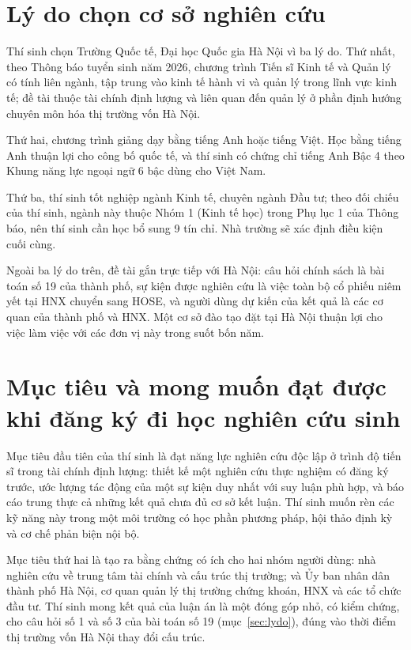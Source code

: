 \chapter{Lý do chọn cơ sở nghiên cứu}\label{ch:5}

Thí sinh chọn Trường Quốc tế, Đại học Quốc gia Hà Nội vì ba lý do. Thứ nhất, theo Thông báo tuyển sinh năm 2026, chương trình Tiến sĩ Kinh tế và Quản lý có tính liên ngành, tập trung vào kinh tế hành vi và quản lý trong lĩnh vực kinh tế; đề tài thuộc tài chính định lượng và liên quan đến quản lý ở phần định hướng chuyên môn hóa thị trường vốn Hà Nội.

Thứ hai, chương trình giảng dạy bằng tiếng Anh hoặc tiếng Việt. Học bằng tiếng Anh thuận lợi cho công bố quốc tế, và thí sinh có chứng chỉ tiếng Anh Bậc 4 theo Khung năng lực ngoại ngữ 6 bậc dùng cho Việt Nam.

Thứ ba, thí sinh tốt nghiệp ngành Kinh tế, chuyên ngành Đầu tư; theo đối chiếu của thí sinh, ngành này thuộc Nhóm 1 (Kinh tế học) trong Phụ lục 1 của Thông báo, nên thí sinh cần học bổ sung 9 tín chỉ. Nhà trường sẽ xác định điều kiện cuối cùng.

Ngoài ba lý do trên, đề tài gắn trực tiếp với Hà Nội: câu hỏi chính sách là bài toán số 19 của thành phố, sự kiện được nghiên cứu là việc toàn bộ cổ phiếu niêm yết tại HNX chuyển sang HOSE, và người dùng dự kiến của kết quả là các cơ quan của thành phố và HNX. Một cơ sở đào tạo đặt tại Hà Nội thuận lợi cho việc làm việc với các đơn vị này trong suốt bốn năm.

\chapter{Mục tiêu và mong muốn đạt được khi đăng ký đi học nghiên cứu sinh}\label{ch:6}

Mục tiêu đầu tiên của thí sinh là đạt năng lực nghiên cứu độc lập ở trình độ tiến sĩ trong tài chính định lượng: thiết kế một nghiên cứu thực nghiệm có đăng ký trước, ước lượng tác động của một sự kiện duy nhất với suy luận phù hợp, và báo cáo trung thực cả những kết quả chưa đủ cơ sở kết luận. Thí sinh muốn rèn các kỹ năng này trong một môi trường có học phần phương pháp, hội thảo định kỳ và cơ chế phản biện nội bộ.

Mục tiêu thứ hai là tạo ra bằng chứng có ích cho hai nhóm người dùng: nhà nghiên cứu về trung tâm tài chính và cấu trúc thị trường; và Ủy ban nhân dân thành phố Hà Nội, cơ quan quản lý thị trường chứng khoán, HNX và các tổ chức đầu tư. Thí sinh mong kết quả của luận án là một đóng góp nhỏ, có kiểm chứng, cho câu hỏi số 1 và số 3 của bài toán số 19 (mục~\ref{sec:lydo}), đúng vào thời điểm thị trường vốn Hà Nội thay đổi cấu trúc.

